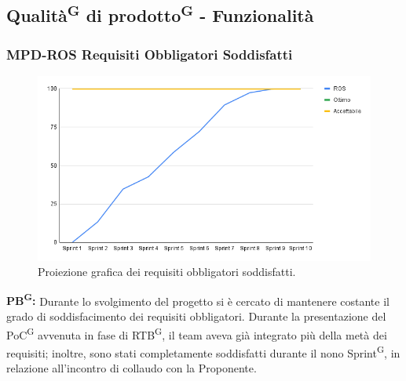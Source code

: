 \documentclass[8pt]{article}
\newcommand{\glossterm}[1]{#1\textsuperscript{G}} %
\begin{document}
\subsection{\glossterm{Qualità} di \glossterm{prodotto} - Funzionalità}
\subsubsection{MPD-ROS Requisiti Obbligatori Soddisfatti}
\begin{figure}[h!]
    \centering
    \includegraphics[width=1\textwidth]{images_pdq/ROS.png}
    \caption{Proiezione grafica dei requisiti obbligatori soddisfatti.}
    \label{fig:Proiezione grafica dei requisiti obbligatori soddisfatti}
\end{figure}
\textbf{\glossterm{PB}:} Durante lo svolgimento del progetto si è cercato di mantenere costante il grado di soddisfacimento dei requisiti obbligatori. Durante la presentazione del \glossterm{PoC} avvenuta in fase di \glossterm{RTB}, il team aveva già integrato più della metà dei requisiti; inoltre, sono stati completamente soddisfatti durante il nono \glossterm{Sprint}, in relazione all'incontro di collaudo con la Proponente.
\clearpage
\end{document}
